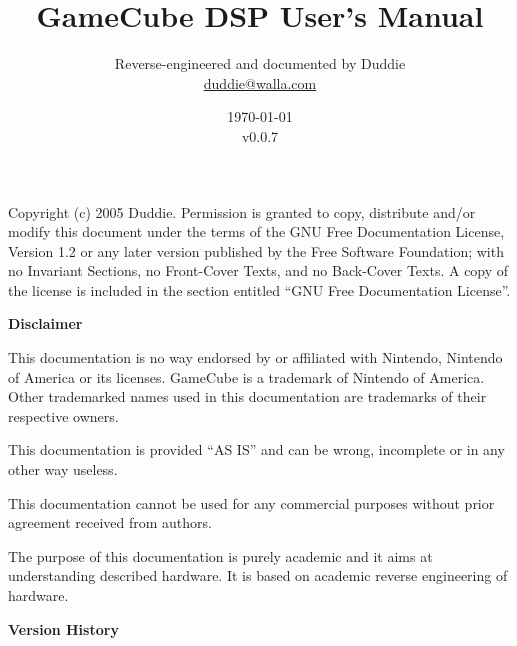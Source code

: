 \documentclass[oneside,english,a4paper,10pt,oneside,openany,final]{memoir}
\title{\textbf{\Huge GameCube DSP User's Manual}}
\author{Reverse-engineered and documented by Duddie \\ \href{mailto:duddie@walla.com}{duddie@walla.com}}
\date{\today\\v0.0.7}
\begin{document}
\maketitle{}

\pagebreak{}
\vspace*{\fill}

Copyright (c) 2005 Duddie. Permission is granted to copy, distribute and/or modify this document under the terms of the GNU Free Documentation License, Version 1.2 or any later version published by the Free Software Foundation; with no Invariant Sections, no Front-Cover Texts, and no Back-Cover Texts. A copy of the license is included in the section entitled ``GNU Free Documentation License''.

\pagebreak{}
\tableofcontents{}
\pagebreak{}

\textbf{\LARGE Disclaimer}
\vspace{5mm}

This documentation is no way endorsed by or affiliated with Nintendo, Nintendo of America or its licenses. GameCube is a trademark of Nintendo of America. Other trademarked names used in this documentation are trademarks of their respective owners.

This documentation is provided ``AS IS'' and can be wrong, incomplete or in any other way useless.

This documentation cannot be used for any commercial purposes without prior agreement received from authors.

The purpose of this documentation is purely academic and it aims at understanding described hardware. It is based on academic reverse engineering of hardware.

\pagebreak{}
\textbf{\LARGE Version History}
\vspace{5mm}
\end{document}
